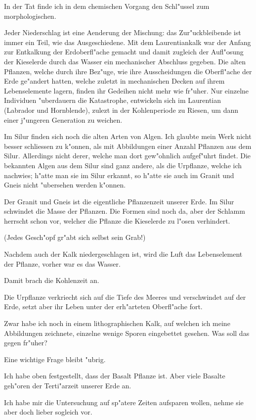 \documentclass[a4paper, 11pt, oneside, german]{article}
\begin{document}
In der Tat finde ich in dem chemischen Vorgang den Schl"ussel zum morphologischen.

Jeder Niederschlag ist eine Aenderung der Mischung: das Zur"uckbleibende ist immer ein Teil, wie das Ausgeschiedene. Mit dem Laurentiankalk war der Anfang zur Entkalkung der Erdoberfl"ache gemacht und damit zugleich der Aufl"osung der Kieselerde durch das Wasser ein mechanischer Abschluss gegeben. Die alten Pflanzen, welche durch ihre Bez"uge, wie ihre Ausscheidungen die Oberfl"ache der Erde ge"andert hatten, welche zuletzt in mechanischen Decken auf ihrem Lebenselemente lagern, finden ihr Gedeihen nicht mehr wie fr"uher. Nur einzelne Individuen "uberdauern die Katastrophe, entwickeln sich im Laurentian (Labrador und Hornblende), zulezt in der Kohlenperiode zu Riesen, um dann einer j"ungeren Generation zu weichen.

Im Silur finden sich noch die alten Arten von Algen. Ich glaubte mein Werk nicht besser schliessen zu k"onnen, als mit Abbildungen einer Anzahl Pflanzen aus dem Silur. Allerdings nicht derer, welche man dort gew"ohnlich aufgef"uhrt findet. Die bekannten Algen aus dem Silur sind ganz andere, als die Urpflanze, welche ich nachwies; h"atte man sie im Silur erkannt, so h"atte sie auch im Granit und Gneis nicht "ubersehen werden k"onnen.

Der Granit und Gneis ist die eigentliche Pflanzenzeit unserer Erde. Im Silur schwindet die Masse der Pflanzen. Die Formen sind noch da, aber der Schlamm herrscht schon vor, welcher die Pflanze die Kieselerde zu l"osen verhindert.

(Jedes Gesch"opf gr"abt sich selbst sein Grab!)

Nachdem auch der Kalk niedergeschlagen ist, wird die Luft das Lebenselement der Pflanze, vorher war es das Wasser.

Damit brach die Kohlenzeit an.

Die Urpflanze verkriecht sich auf die Tiefe des Meeres und verschwindet auf der Erde, setzt aber ihr Leben unter der erh"arteten Oberfl"ache fort.

Zwar habe ich noch in einem lithographischen Kalk, auf welchen ich meine Abbildungen zeichnete, einzelne wenige Sporen eingebettet gesehen. Was soll das gegen fr"uher?

Eine wichtige Frage bleibt "ubrig.

Ich habe oben festgestellt, dass der Basalt Pflanze ist. Aber viele Basalte geh"oren der Terti"arzeit unserer Erde an.

Ich habe mir die Untersuchung auf sp"atere Zeiten aufsparen wollen, nehme sie aber doch lieber sogleich vor.
\end{document}

